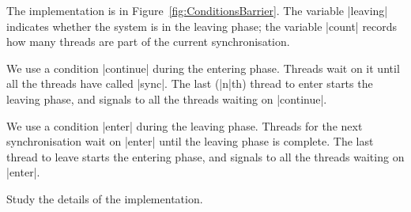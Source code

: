
The implementation is in Figure~\ref{fig:ConditionsBarrier}.  The variable
|leaving| indicates whether the system is in the leaving phase; the variable
|count| records how many threads are part of the current synchronisation.  

We use a condition |continue| during the entering phase.  Threads wait on it
until all the threads have called |sync|.  The last (|n|th) thread to enter
starts the leaving phase, and signals to all the threads waiting on
|continue|.

We use a condition |enter| during the leaving phase.  Threads for the next
synchronisation wait on |enter| until the leaving phase is complete.  The last
thread to leave starts the entering phase, and signals to all the threads
waiting on |enter|.

\begin{instruction}
Study the details of the implementation. 
\end{instruction}
